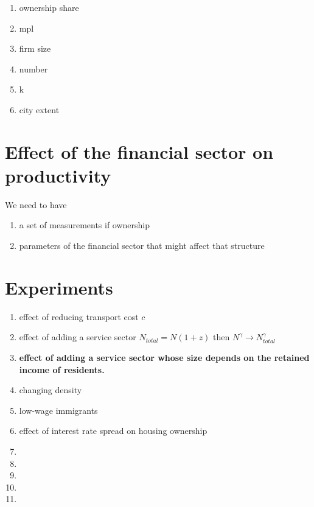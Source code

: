 \begin{itemize}
\begin{enumerate}
  
   \begin{enumerate}
         \item ownership share  
        \item mpl            
        \item firm size            
        \item number 
        \item k         
        \item city extent   
     \end{enumerate}
    \end{enumerate}
    


\section{Effect of the financial sector on productivity}
We need to have  
\begin{enumerate}
    \item a set of measurements if ownership
    \item parameters of the financial sector  that might affect that structure

\end{enumerate}

  
\section{Experiments}
  \begin{enumerate}
    \item effect of reducing transport cost $c$
    \item effect of adding a service sector $N_{total} = N(1+z)$ then $N^\gamma \rightarrow  N_{total}^\gamma$
    \item \textbf{effect of adding a service sector whose size depends on the retained income of residents.}
    \item changing density
    \item low-wage immigrants
    \item effect of interest rate spread on housing ownership
    \item 
    \item 
    \item 
    \item 
    \item 
   
    
\end{enumerate} 
    
\end{itemize}
